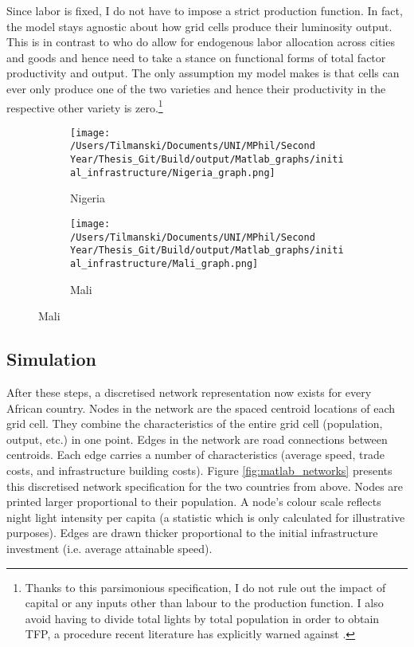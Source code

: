 \documentclass[11pt, oneside]{article}   	%
\begin{document}
Since labor is fixed, I do not have to impose a strict production function. In fact, the model stays agnostic about how grid cells produce their luminosity output. This is in contrast to \citeauthor{fajgelbaum_optimal_2017} who do allow for endogenous labor allocation across cities and goods and hence need to take a stance on functional forms of total factor productivity and output. The only assumption my model makes is that cells can ever only produce one of the two varieties and hence their productivity in the respective other variety is zero.\footnote{Thanks to this parsimonious specification, I do not rule out the impact of capital or any inputs other than labour to the production function. I also avoid having to divide total lights by total population in order to obtain TFP, a procedure recent literature has explicitly warned against \citep[see e.g.][]{michalopoulos_spatial_2018}.}

\begin{figure}[t]
\centering
\caption{Discretised Networks for different countries}

\begin{subfigure}[c]{0.48\textwidth}
\texttt{[image: /Users/Tilmanski/Documents/UNI/MPhil/Second Year/Thesis\_Git/Build/output/Matlab\_graphs/initial\_infrastructure/Nigeria\_graph.png]}
\caption{Nigeria}
\label{fig:nigeria_mat}
\end{subfigure}
\begin{subfigure}[c]{0.48\textwidth}
\texttt{[image: /Users/Tilmanski/Documents/UNI/MPhil/Second Year/Thesis\_Git/Build/output/Matlab\_graphs/initial\_infrastructure/Mali\_graph.png]}
\caption{Mali}
\label{fig:Mali_mat}
\end{subfigure}
\label{fig:matlab_networks}
\end{figure}

\subsection{Simulation}

After these steps, a discretised network representation now exists for every African country. Nodes in the network are the spaced centroid locations of each grid cell. They combine the characteristics of the entire grid cell (population, output, etc.) in one point. Edges in the network are road connections between centroids. Each edge carries a number of characteristics (average speed, trade costs, and infrastructure building costs). Figure \eqref{fig:matlab_networks} presents this discretised network specification for the two countries from above. Nodes are printed larger proportional to their population. A node's colour scale reflects night light intensity per capita (a statistic which is only calculated for illustrative purposes). Edges are drawn thicker proportional to the initial infrastructure investment (i.e. average attainable speed).
\end{document}
